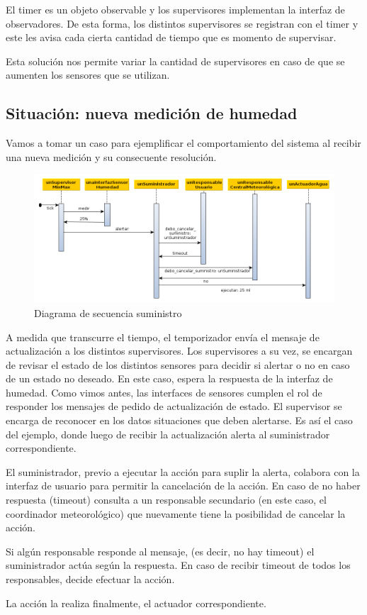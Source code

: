 El timer es un objeto observable y los supervisores implementan la interfaz de observadores. De esta forma, los distintos supervisores se registran con el timer y este les avisa cada cierta cantidad de tiempo que es momento de supervisar.

Esta solución nos permite variar la cantidad de supervisores en caso de que se aumenten los sensores que se utilizan.



\subsection{Situación: nueva medición de humedad}
Vamos a tomar un caso para ejemplificar el comportamiento del sistema al recibir una nueva medición y su consecuente resolución.

\begin{figure}[h!]
  \centering
  \includegraphics[width=1\textwidth]{./imagenes/secuencia_suministro1.png}
  \caption{Diagrama de secuencia suministro}
  \label{fig:sec_sum1}
\end{figure}

A medida que transcurre el tiempo, el temporizador envía el mensaje de actualización a los distintos supervisores. 
Los supervisores a su vez, se encargan de revisar el estado de los distintos sensores para decidir si alertar o no en caso de un estado no deseado.
En este caso, espera la respuesta de la interfaz de humedad. Como vimos antes, las interfaces de sensores cumplen el rol de responder los mensajes de pedido de actualización de estado. 
El supervisor se encarga de reconocer en los datos situaciones que deben alertarse. Es así el caso del ejemplo, donde luego de recibir la actualización alerta al suministrador correspondiente.

El suministrador, previo a ejecutar la acción para suplir la alerta, colabora con la interfaz de usuario para permitir la cancelación de la acción. En caso de no haber respuesta (timeout) consulta a un responsable secundario (en este caso, el coordinador meteorológico) que nuevamente tiene la posibilidad de cancelar la acción.

Si algún responsable responde al mensaje, (es decir, no hay timeout) el suministrador actúa según la respuesta. En caso de recibir timeout de todos los responsables, decide efectuar la acción.

La acción la realiza finalmente, el actuador correspondiente.
